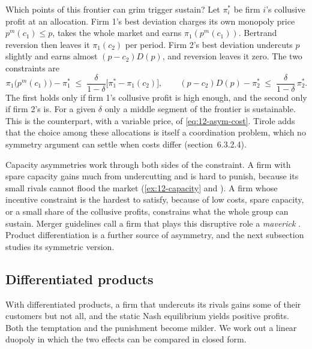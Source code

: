 Which points of this frontier can grim trigger sustain? Let $\pi_i^*$ be firm $i$'s collusive profit at an
allocation. Firm 1's best deviation charges its own monopoly price $p^m(c_1) \le p$, takes the whole market and earns
$\pi_1(p^m(c_1))$. Bertrand reversion then leaves it $\pi_1(c_2)$ per period. Firm 2's best deviation undercuts $p$
slightly and earns almost $(p - c_2)D(p)$, and reversion leaves it zero. The two constraints are
\begin{equation}\label{eq:12-asym-ic}
\pi_1\bigl(p^m(c_1)\bigr) - \pi_1^* \;\le\; \frac{\delta}{1 - \delta}\bigl[\pi_1^* - \pi_1(c_2)\bigr],
\qquad
(p - c_2)D(p) - \pi_2^* \;\le\; \frac{\delta}{1 - \delta}\,\pi_2^* .
\end{equation}
The first holds only if firm 1's collusive profit is high enough, and the second only if firm 2's is. For a given
$\delta$ only a middle segment of the frontier is sustainable. This is the counterpart, with a variable price, of
\eqref{eq:12-asym-cost}. Tirole adds that the choice among these allocations is itself a coordination problem, which
no symmetry argument can settle when costs differ (section~6.3.2.4).

Capacity asymmetries work through both sides of the constraint. A firm with spare capacity gains much from undercutting
and is hard to punish, because its small rivals cannot flood the market (\cref{ex:12-capacity} and
\citealp{CompteJennyRey2002}). A firm whose incentive constraint is the hardest to satisfy, because of low costs, spare
capacity, or a small share of the collusive profits, constrains what the whole group can sustain. Merger guidelines
call a firm that plays this disruptive role a \emph{maverick} \citep{USDOJFTC2010}. Product differentiation is a
further source of asymmetry, and the next subsection studies its symmetric version.

\subsection{Differentiated products}\label{sec:12-diffprod}

With differentiated products, a firm that undercuts its rivals gains some of their customers but not all, and the
static Nash equilibrium yields positive profits. Both the temptation and the punishment become milder. We work out a
linear duopoly in which the two effects can be compared in closed form.

